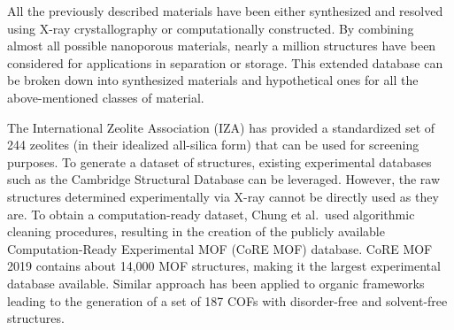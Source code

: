 \documentclass[main.tex]{subfiles}
\begin{document}
All the previously described materials have been either synthesized and resolved using X-ray crystallography or computationally constructed. By combining almost all possible nanoporous materials, nearly a million structures have been considered for applications in separation or storage.\autocite{Simon_2015,Simon_2015_EES,Thornton_2017} This extended database can be broken down into synthesized materials and hypothetical ones for all the above-mentioned classes of material.

The International Zeolite Association (IZA) has provided a standardized set of 244 zeolites (in their idealized all-silica form) that can be used for screening purposes. To generate a dataset of structures, existing experimental databases such as the Cambridge Structural Database can be leveraged. However, the raw structures determined experimentally via X-ray cannot be directly used as they are. To obtain a computation-ready dataset, Chung et al.\ used algorithmic cleaning procedures, resulting in the creation of the publicly available Computation-Ready Experimental MOF (CoRE MOF) database.\autocite{Chung_2014, Chung_2019} CoRE MOF 2019 contains about 14,000 MOF structures, making it the largest experimental database available. Similar approach has been applied to organic frameworks leading to the generation of a set of 187 COFs with disorder-free and solvent-free structures.\autocite{Tong_2017,Ongari_2019}
\end{document}
